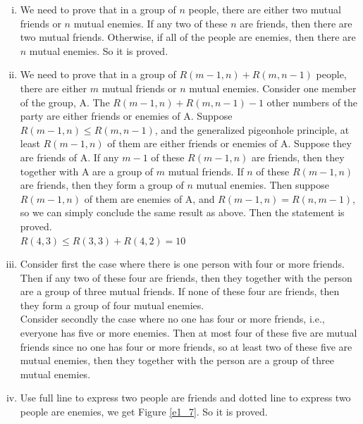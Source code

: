 \documentclass{article}
\begin{document}
\begin{enumerate}[i)]
\item
We need to prove that in a group of $n$ people, there are either two mutual friends or $n$ mutual enemies. If any two of these $n$ are friends, then there are two mutual friends. Otherwise, if all of the people are enemies, then there are $n$ mutual enemies. So it is proved.

\item
We need to prove that in a group of $R(m-1,n)+R(m,n-1)$ people, there are either $m$ mutual friends or $n$ mutual enemies. Consider one member of the group, A. The $R(m-1,n)+R(m,n-1)-1$ other numbers of the party are either friends or enemies of A. Suppose $R(m-1,n)\leqslant R(m,n-1)$, and the generalized pigeonhole principle, at least $R(m-1,n)$ of them are either friends or enemies of A. Suppose they are friends of A. If any $m-1$ of these $R(m-1,n)$ are friends, then they together with A are a group of $m$ mutual friends. If $n$ of these $R(m-1,n)$ are friends, then they form a group of $n$ mutual enemies. Then suppose $R(m-1,n)$ of them are enemies of A, and $R(m-1,n)=R(n,m-1)$, so we can simply conclude the same result as above. Then the statement is proved.\\
$R(4,3)\leqslant R(3,3)+R(4,2)=10$

\item
Consider first the case where there is one person with four or more friends. Then if any two of these four are friends, then they together with the person are a group of three mutual friends. If none of these four are friends, then they form a group of four mutual enemies.\\
Consider secondly the case where no one has four or more friends, i.e., everyone has five or more enemies. Then at most four of these five are mutual friends since no one has four or more friends, so at least two of these five are mutual enemies,  then they together with the person are a group of three mutual enemies.

\item
Use full line to express two people are friends and dotted line to express two people are enemies, we get Figure \ref{e1_7}. So it is proved.


\end{enumerate}
\end{document}
